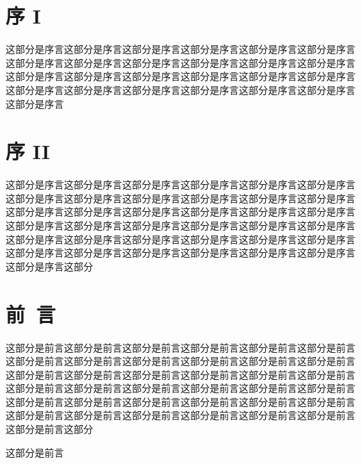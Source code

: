 \documentclass[utf8]{book}
\begin{document}
\title{}

\author{ 编著}

\date{2018年1月}

\frontmatter

\maketitle

\chapter{序 I}

这部分是序言这部分是序言这部分是序言这部分是序言这部分是序言这部分是序言这部分是序言这部分是序言这部分是序言这部分是序言这部分是序言这部分是序言这部分是序言这部分是序言这部分是序言这部分是序言这部分是序言这部分是序言这部分是序言这部分是序言这部分是序言这部分是序言这部分是序言这部分是序言这部分是序言

\chapter{序 II}

这部分是序言这部分是序言这部分是序言这部分是序言这部分是序言这部分是序言这部分是序言这部分是序言这部分是序言这部分是序言这部分是序言这部分是序言这部分是序言这部分是序言这部分是序言这部分是序言这部分是序言这部分是序言这部分是序言这部分是序言这部分是序言这部分是序言这部分是序言这部分是序言这部分是序言这部分是序言这部分是序言这部分是序言这部分是序言这部分是序言这部分是序言这部分是序言这部分是序言这部分是序言这部分是序言这部分是序言这部分是序言这部分

\chapter{前~言}

这部分是前言这部分是前言这部分是前言这部分是前言这部分是前言这部分是前言这部分是前言这部分是前言这部分是前言这部分是前言这部分是前言这部分是前言这部分是前言这部分是前言这部分是前言这部分是前言这部分是前言这部分是前言这部分是前言这部分是前言这部分是前言这部分是前言这部分是前言这部分是前言这部分是前言这部分是前言这部分是前言这部分是前言这部分是前言这部分是前言这部分是前言这部分是前言这部分是前言这部分是前言这部分是前言这部分是前言这部分是前言这部分

这部分是前言

\renewcommand\contentsname{目~录}

\tableofcontents
\end{document}
